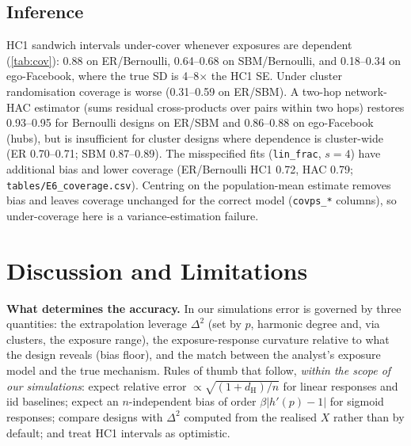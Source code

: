 \documentclass{article}
\theoremstyle{plain}
\theoremstyle{remark}
\newcommand{\dH}{d_{\mathrm H}}
\begin{document}
\subsection{Inference}\label{sec:inference}
\begin{table}[t]
\caption{Coverage of nominal 95\% intervals for the correctly-specified regression (E6; 4 populations $\times$ 200 replicates; coverage of the true $\tau$). SE-ratio = within-population empirical SD / mean HC1 SE.}\label{tab:cov}
\centering\small

\end{table}
HC1 sandwich intervals under-cover whenever exposures are dependent (\cref{tab:cov}): 0.88 on ER/Bernoulli, 0.64--0.68 on SBM/Bernoulli, and 0.18--0.34 on ego-Facebook, where the true SD is 4--8$\times$ the HC1 SE. Under cluster randomisation coverage is worse (0.31--0.59 on ER/SBM). A two-hop network-HAC estimator (sums residual cross-products over pairs within two hops) restores 0.93--0.95 for Bernoulli designs on ER/SBM and 0.86--0.88 on ego-Facebook (hubs), but is insufficient for cluster designs where dependence is cluster-wide (ER 0.70--0.71; SBM 0.87--0.89). The misspecified fits (\texttt{lin\_frac}, $s=4$) have additional bias and lower coverage (ER/Bernoulli HC1 0.72, HAC 0.79; \texttt{tables/E6\_coverage.csv}). Centring on the population-mean estimate removes bias and leaves coverage unchanged for the correct model (\texttt{covps\_*} columns), so under-coverage here is a variance-estimation failure.

\section{Discussion and Limitations}\label{sec:disc}
\textbf{What determines the accuracy.} In our simulations error is governed by three quantities: the extrapolation leverage $\Delta^2$ (set by $p$, harmonic degree and, via clusters, the exposure range), the exposure-response curvature relative to what the design reveals (bias floor), and the match between the analyst's exposure model and the true mechanism. Rules of thumb that follow, \emph{within the scope of our simulations}: expect relative error $\propto\sqrt{(1+\dH)/n}$ for linear responses and iid baselines; expect an $n$-independent bias of order $\beta|h'(p)-1|$ for sigmoid responses; compare designs with $\Delta^2$ computed from the realised $X$ rather than by default; and treat HC1 intervals as optimistic.
\end{document}
